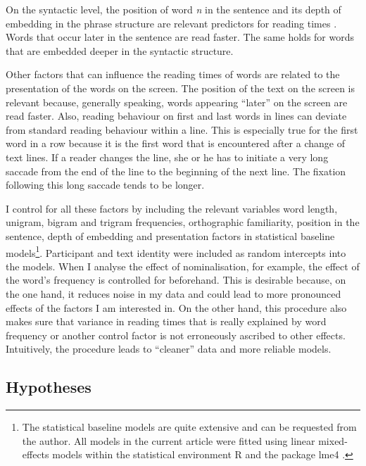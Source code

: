 \documentclass[output=paper]{langsci/langscibook}
\begin{document}
On the syntactic level, the position of word \textit{n} in the sentence and its depth of embedding in the phrase structure are relevant predictors for reading times \citep[cf. ][]{Pynte2008}. Words that occur later in the sentence are read faster. The same holds for words that are embedded deeper in the syntactic structure.

Other factors that can influence the reading times of words are related to the presentation of the words on the screen. The position of the text on the screen is relevant because, generally speaking, words appearing ``later'' on the screen are read faster. Also, reading behaviour on first and last words in lines can deviate from standard reading behaviour within a line. This is especially true for the first word in a row because it is the first word that is encountered after a change of text lines. If a reader changes the line, she or he has to initiate a very long saccade from the end of the line to the beginning of the next line. The fixation following this long saccade tends to be longer.

I control for all these factors by including the relevant variables word length, unigram, bigram and trigram frequencies, orthographic familiarity, position in the sentence, depth of embedding and presentation factors in statistical baseline models\footnote{The statistical baseline models are quite extensive and can be requested from the author. All models in the current article were fitted using linear mixed-effects models within the statistical environment R \citep{R2014} and the package lme4 \citep{Bates2014}.}. Participant and text identity were included as random intercepts into the models. When I analyse the effect of nominalisation, for example, the effect of the word's frequency is controlled for beforehand. This is desirable because, on the one hand, it reduces noise in my data and could lead to more pronounced effects of the factors I am interested in. On the other hand, this procedure also makes sure that variance in reading times that is really explained by word frequency or another control factor is not erroneously ascribed to other effects. Intuitively, the procedure leads to ``cleaner'' data and more reliable models. 

\subsection{\label{bkm:Ref283726131}Hypotheses}
\end{document}

